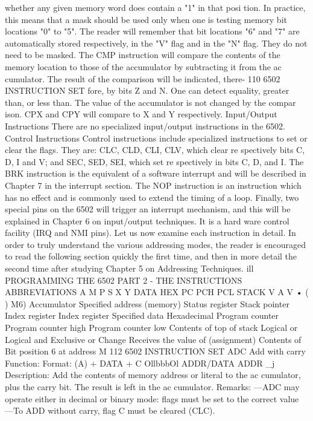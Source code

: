 \documentclass{book}
\begin{document}
whether any given memory word does contain a "1" in that posi
tion. In practice, this means that a mask should be used only
when one is testing memory bit locations "0" to "5". The reader
will remember that bit locations "6" and "7" are automatically
stored respectively, in the "V" flag and in the "N" flag. They do not
need to be masked.
The CMP instruction will compare the contents of the memory
location to those of the accumulator by subtracting it from the ac
cumulator. The result of the comparison will be indicated, there-
110
6502 INSTRUCTION SET
fore, by bits Z and N. One can detect equality, greater than, or less
than. The value of the accumulator is not changed by the compar
ison. CPX and CPY will compare to X and Y respectively.
Input/Output Instructions
There are no specialized input/output instructions in the 6502.
Control Instructions
Control instructions include specialized instructions to set or
clear the flags. They are: CLC, CLD, CLI, CLV, which clear re
spectively bits C, D, I and V; and SEC, SED, SEI, which set re
spectively in bits C, D, and I.
The BRK instruction is the equivalent of a software interrupt
and will be described in Chapter 7 in the interrupt section.
The NOP instruction is an instruction which has no effect and is
commonly used to extend the timing of a loop. Finally, two special
pins on the 6502 will trigger an interrupt mechanism, and this will
be explained in Chapter 6 on input/output techniques. It is a hard
ware control facility (IRQ and NMI pins).
Let us now examine each instruction in detail.
In order to truly understand the various addressing modes, the reader
is encouraged to read the following section quickly the first time, and
then in more detail the second time after studying Chapter 5 on
Addressing Techniques.
ill
PROGRAMMING THE 6502
PART 2 - THE INSTRUCTIONS
ABBREVIATIONS
A
M
P
S
X
Y
DATA
HEX
PC
PCH
PCL
STACK
V
A
V
•
( )
M6)
Accumulator
Specified address (memory)
Status register
Stack pointer
Index register
Index register
Specified data
Hexadecimal
Program counter
Program counter high
Program counter low
Contents of top of stack
Logical or
Logical and
Exclusive or
Change
Receives the value of (assignment)
Contents of
Bit position 6 at address M
112
6502 INSTRUCTION SET
ADC Add with carry
Function:
Format:
(A) + DATA + C
OllbbbOl ADDR/DATA ADDR
_j
Description:
Add the contents of memory address or literal to the ac
cumulator, plus the carry bit. The result is left in the ac
cumulator.
Remarks:
—ADC may operate either in decimal or binary mode: flags
must be set to the correct value
—To ADD without carry, flag C must be cleared (CLC).
\end{document}
